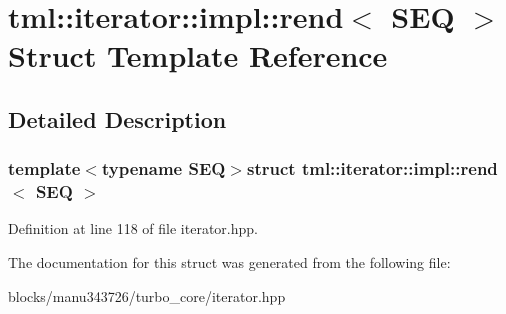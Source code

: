 \hypertarget{structtml_1_1iterator_1_1impl_1_1rend}{\section{tml\+:\+:iterator\+:\+:impl\+:\+:rend$<$ S\+E\+Q $>$ Struct Template Reference}
\label{structtml_1_1iterator_1_1impl_1_1rend}
}


\subsection{Detailed Description}
\subsubsection*{template$<$typename S\+E\+Q$>$struct tml\+::iterator\+::impl\+::rend$<$ S\+E\+Q $>$}



Definition at line 118 of file iterator.\+hpp.



The documentation for this struct was generated from the following file\+:\begin{DoxyCompactItemize}
\item 
blocks/manu343726/turbo\+\_\+core/iterator.\+hpp\end{DoxyCompactItemize}
